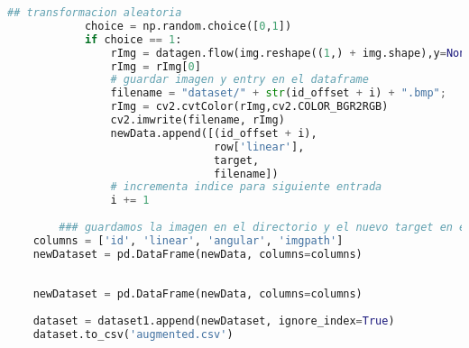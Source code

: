 \begin{lstlisting}[title={augmentation.py},language=Python]
            ## transformacion aleatoria
            choice = np.random.choice([0,1])
            if choice == 1:
                rImg = datagen.flow(img.reshape((1,) + img.shape),y=None, batch_size=1).next()
                rImg = rImg[0]
                # guardar imagen y entry en el dataframe
                filename = "dataset/" + str(id_offset + i) + ".bmp";
                rImg = cv2.cvtColor(rImg,cv2.COLOR_BGR2RGB)
                cv2.imwrite(filename, rImg)
                newData.append([(id_offset + i), 
                                row['linear'], 
                                target,
                                filename])
                # incrementa indice para siguiente entrada
                i += 1
 
        ### guardamos la imagen en el directorio y el nuevo target en el d
    columns = ['id', 'linear', 'angular', 'imgpath']
    newDataset = pd.DataFrame(newData, columns=columns)
    
    
    newDataset = pd.DataFrame(newData, columns=columns)
    
    dataset = dataset1.append(newDataset, ignore_index=True)
    dataset.to_csv('augmented.csv')
    \end{lstlisting}

